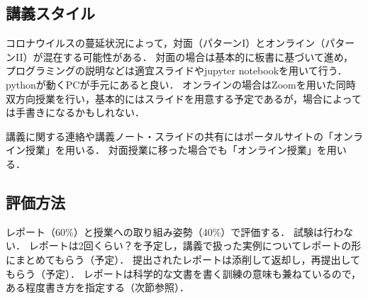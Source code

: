 \subsection{講義スタイル}
%
コロナウイルスの蔓延状況によって，対面（パターンI）とオンライン（パターンII）が混在する可能性がある．
%
対面の場合は基本的に板書に基づいて進め，プログラミングの説明などは適宜スライドやjupyter notebookを用いて行う．
%
pythonが動くPCが手元にあると良い．
%
オンラインの場合はZoomを用いた同時双方向授業を行い，基本的にはスライドを用意する予定であるが，場合によっては手書きになるかもしれない．
%

%
講義に関する連絡や講義ノート・スライドの共有にはポータルサイトの「オンライン授業」を用いる．
%
対面授業に移った場合でも「オンライン授業」を用いる．
%

\subsection{評価方法}
%
レポート（60\%）と授業への取り組み姿勢（40\%）で評価する．
%
試験は行わない．
%
レポートは2回くらい？を予定し，講義で扱った実例についてレポートの形にまとめてもらう（予定）．
%
提出されたレポートは添削して返却し，再提出してもらう（予定）．
%
レポートは科学的な文書を書く訓練の意味も兼ねているので，ある程度書き方を指定する（次節参照）．
%

